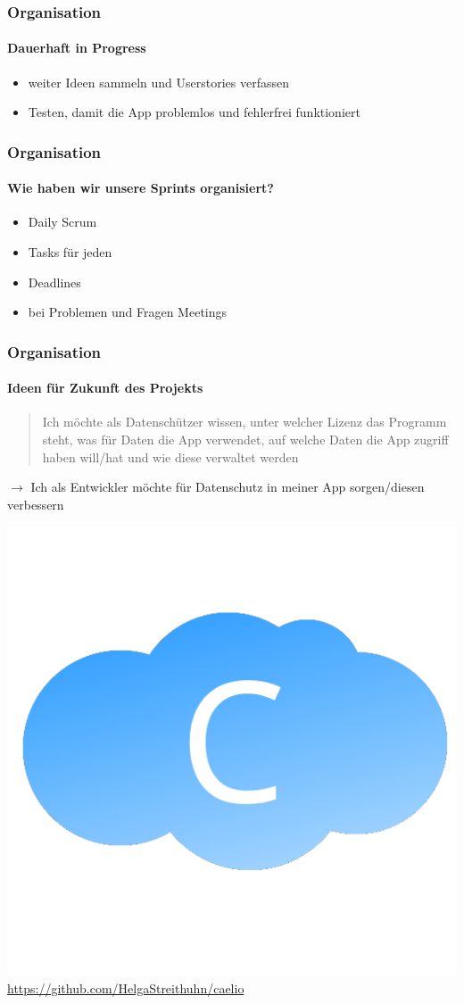 \documentclass[notes]{beamer}
\begin{document}
	\begin{frame}
		\frametitle{Organisation}
		\framesubtitle{Dauerhaft in Progress}
		\begin{itemize}
			\item weiter Ideen sammeln und Userstories verfassen 
			\item Testen, damit die App problemlos und fehlerfrei funktioniert
		\end{itemize}
	\end{frame}
	\begin{frame}
		\frametitle{Organisation}
		\framesubtitle{Wie haben wir unsere Sprints organisiert?}
		\begin{itemize}
			\item Daily Scrum 
			\item Tasks für jeden 
			\item Deadlines 
			\item bei Problemen und Fragen Meetings 
		\end{itemize}
	\end{frame}
	\begin{frame}
		\frametitle{Organisation}
		\framesubtitle{Ideen für Zukunft des Projekts}
		\begin{quote}
			Ich möchte als Datenschützer wissen, unter welcher Lizenz das Programm steht, was für Daten die App verwendet, auf welche Daten die App zugriff haben will/hat und wie diese verwaltet werden
		\end{quote}
		\vfill
		$\rightarrow$ Ich als Entwickler möchte für Datenschutz in meiner App sorgen/diesen verbessern
	\end{frame}
	\begin{frame}
		\thispagestyle{empty}
		\centering
		\includegraphics[height = .5\textheight]{../../Anwendung/Icons/caelio}
		\url{https://github.com/HelgaStreithuhn/caelio}
	\end{frame}
\end{document}
